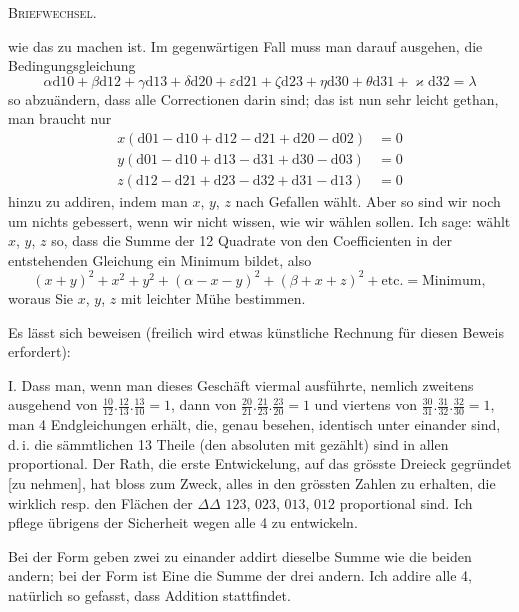 \begingroup
\clearpage
{}\hfill\textsc{Briefwechsel.}\hfill\mbox{}\par\medskip
\noindent wie das zu machen ist. Im gegenwärtigen Fall muss man darauf ausgehen, die Bedingungsgleichung
\[
\alpha\mathrm d10+\beta\mathrm d12+\gamma\mathrm d13+\delta\mathrm d20+\varepsilon\mathrm d21+\zeta\mathrm d23+\eta\mathrm d30+\theta\mathrm d31+\varkappa\mathrm d32=\lambda
\]
so abzuändern, dass alle Correctionen darin sind; das ist nun sehr leicht gethan, man braucht nur
\[
\begin{aligned}
x(\mathrm d01-\mathrm d10+\mathrm d12-\mathrm d21+\mathrm d20-\mathrm d02)&=0\\
y(\mathrm d01-\mathrm d10+\mathrm d13-\mathrm d31+\mathrm d30-\mathrm d03)&=0\\
z(\mathrm d12-\mathrm d21+\mathrm d23-\mathrm d32+\mathrm d31-\mathrm d13)&=0
\end{aligned}
\]
hinzu zu addiren, indem man $x$, $y$, $z$ nach Gefallen wählt. Aber so sind wir noch um nichts gebessert, wenn wir nicht wissen, wie wir wählen sollen. Ich sage: wählt $x$, $y$, $z$ so, dass die Summe der 12 Quadrate von den Coefficienten in der entstehenden Gleichung ein Minimum bildet, also
\[
(x+y)^2+x^2+y^2+(\alpha-x-y)^2+(\beta+x+z)^2+\text{etc.}=\text{Minimum},
\]
woraus Sie $x$, $y$, $z$ mit leichter Mühe bestimmen.

Es lässt sich beweisen (freilich wird etwas künstliche Rechnung für diesen Beweis erfordert):

I. Dass man, wenn man dieses Geschäft viermal ausführte, nemlich zweitens ausgehend von $\frac{10}{12}.\frac{12}{13}.\frac{13}{10}=1$, dann von $\frac{20}{21}.\frac{21}{23}.\frac{23}{20}=1$ und viertens von $\frac{30}{31}.\frac{31}{32}.\frac{32}{30}=1$, man 4 Endgleichungen erhält, die, genau besehen, identisch unter einander sind, d.\,i. die sämmtlichen 13 Theile (den absoluten mit gezählt) sind in allen proportional. Der Rath, die erste Entwickelung, auf das grösste Dreieck gegründet [zu nehmen], hat bloss zum Zweck, alles in den grössten Zahlen zu erhalten, die wirklich resp. den Flächen der $\Delta\Delta$ $123$, $023$, $013$, $012$ proportional sind. Ich pflege übrigens der Sicherheit wegen alle 4 zu entwickeln.

Bei der Form  geben zwei zu einander addirt dieselbe Summe wie die beiden andern; bei der Form  ist Eine die Summe der drei andern. Ich addire alle 4, natürlich so gefasst, dass  Addition stattfindet.

